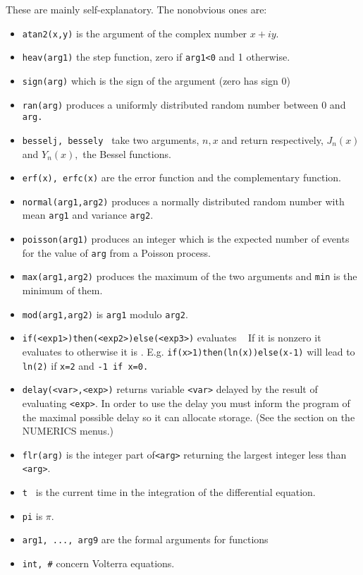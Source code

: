 \documentclass{article}
\begin{document}
These are mainly self-explanatory. The nonobvious ones are:
\begin{itemize}
\item {\tt atan2(x,y)} is the argument of the complex number $x+iy.$
\item {\tt heav(arg1)} the step function, zero if {\tt arg1<0} and 1 otherwise.
\item {\tt sign(arg)} which is the sign of the argument (zero has sign 0)
\item {\tt ran(arg)} produces a uniformly distributed random number
between 0 and {\tt arg.}
\item {\tt besselj, bessely } take two arguments, $n,x$ and return
respectively, $J_n(x)$ and $Y_n(x),$ the Bessel functions.
\item { \tt erf(x), erfc(x)} are the error function and the
complementary function. 
\item {\tt normal(arg1,arg2)} produces a normally distributed random number
with mean {\tt arg1}  and variance {\tt arg2}.
\item {\tt poisson(arg1)} produces an integer which is the expected number
of events for the value of {\tt arg} from a Poisson process.
\item {\tt max(arg1,arg2)} produces the maximum of the two arguments
and {\tt min}  is 
the minimum of them.
\item {\tt mod(arg1,arg2)} is  {\tt arg1} modulo {\tt arg2}. 
\item {\tt if(<exp1>)then(<exp2>)else(<exp3>)} evaluates {\tt <exp1> }
If it is nonzero 
it evaluates to {\tt <exp2>} otherwise it is { \tt <exp3>}.  E.g. {\tt if(x>1)then(ln(x))else(x-1)}
will lead to {\tt ln(2)}  if {\tt x=2}  and { \tt -1 if x=0.}
\item {\tt delay(<var>,<exp>)} returns variable {\tt <var>} delayed by the result of
 evaluating {\tt <exp>}.  In order to use the delay you must inform
the program of the maximal possible delay so it can allocate storage.
(See the section on the NUMERICS menus.)
\item {\tt  flr(arg)}  is the integer part of{\tt  <arg>} returning the largest integer less than {\tt <arg>}.  
\item  {\tt t } is the current time in the integration of the differential equation.
\item {\tt  pi}  is $\pi.$ 
\item {\tt arg1, ..., arg9} are the formal arguments for functions 
\item {\tt int, \#} concern Volterra equations.

\end{itemize}
\end{document}
